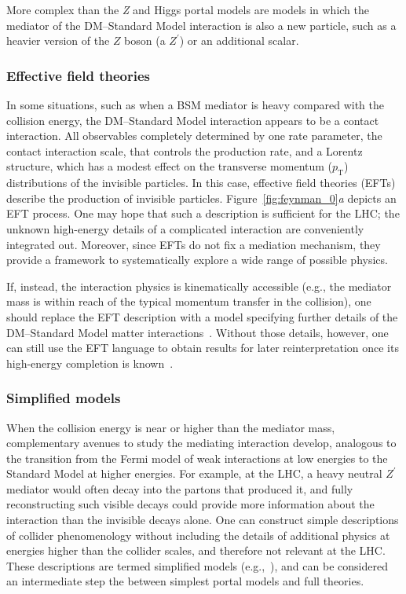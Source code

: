\documentclass{ar-1col}
\newcommand{\IP}{invisible particle}
\newcommand{\pt}{\ensuremath{p_\mathrm{T}}\xspace}
\newcommand{\Zprime}{\ensuremath{{Z}^\prime}\xspace}
\begin{document}
{More complex than the \textit{Z} and Higgs portal
models are models in which the mediator of the
DM--Standard Model interaction is also a new particle, such
as a heavier version of the $Z$ boson (a $Z^\prime$) or an
additional scalar.

\subsubsection{Effective field theories}\label{sub:EFT}

In some situations, such as when a BSM mediator is heavy compared
with the collision energy, the DM--Standard Model interaction appears to be a
contact interaction. All observables completely determined by
one rate parameter, the contact interaction scale, that controls
the production rate, and a Lorentz structure, which has a
modest effect on the transverse momentum (\pt) distributions of the
{\IP}s. In this case, effective field theories
(EFTs)~\cite{Beltran:2010ww,Goodman:2010ku,Bai:2010hh,Fox:2011pm} describe the production of {\IP}s. Figure~\ref{fig:feynman_0}\textit{a} depicts an EFT
process. One may
hope that such a description is sufficient for the LHC; the
unknown high-energy details of a complicated interaction are
conveniently integrated out. Moreover, since EFTs do not fix a
mediation mechanism, they provide a framework to systematically
explore a wide range of possible physics.

If, instead, the interaction physics is kinematically accessible
(e.g., the mediator mass is within reach of the typical momentum
transfer in the collision), one should replace the EFT description
with a model specifying further details of the DM--Standard Model matter
interactions~\cite{Shoemaker:2011vi}. Without those details,
however, one can still use the EFT language to obtain results for
later reinterpretation once its high-energy completion is known~\cite{Racco:2015dxa,Busoni:2013lha}.

\subsubsection{Simplified models}\label{sub:simplifiedModels}

When the collision energy is near or higher than the mediator
mass, complementary avenues to study the mediating interaction
develop, analogous to the transition from the Fermi model of weak
interactions at low energies to the Standard Model at higher
energies. For example, at the LHC, a heavy neutral \Zprime
mediator would often decay into the partons that produced it, and
fully reconstructing such visible decays could provide more
information about the interaction than the invisible decays alone.
One can construct simple descriptions of collider phenomenology without 
including the details of additional physics at energies higher than 
the collider scales, and therefore not relevant at the LHC.
These descriptions are termed simplified models
(e.g.,~),
and can be considered an intermediate step the between simplest portal
models and full theories. 

}
\end{document}
